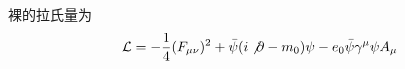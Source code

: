 

裸的拉氏量为
\begin{equation}
\begin{aligned}
\mathcal{L}=-\frac{1}{4}(F_{\mu\nu})^2+\bar\psi (i\not\partial -m_0)\psi - e_0\bar\psi \gamma^\mu\psi A_\mu
\end{aligned}
\end{equation}
